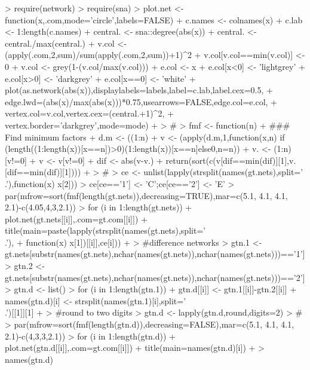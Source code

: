 \documentclass[12pt]{article}
\begin{document}
\begin{Schunk}
\begin{Sinput}
> require(network)
> require(sna)
> plot.net <- function(x,.com,mode='circle',labels=FALSE){
+   c.names <- colnames(x)
+   c.lab <- 1:length(c.names)
+   central. <- sna::degree(abs(x))
+   central. <- central./max(central.)
+   v.col <-(apply(.com,2,sum)/sum(apply(.com,2,sum))+1)^2
+   v.col[v.col==min(v.col)] <- 0
+   v.col <- grey(1-(v.col/max(v.col)))
+   e.col <- x
+   e.col[x<0] <- 'lightgrey'
+   e.col[x>0] <- 'darkgrey'
+   e.col[x==0] <- 'white'
+   plot(as.network(abs(x)),displaylabels=labels,label=c.lab,label.cex=0.5,
+        edge.lwd=(abs(x)/max(abs(x)))*0.75,usearrows=FALSE,edge.col=e.col,
+        vertex.col=v.col,vertex.cex=(central.+1)^2,
+        vertex.border='darkgrey',mode=mode)
+ }
>                                         #
> fmf <- function(n){
+ ### Find minimum factors
+   d.m <- ((1:n)%
+   v <- (apply(d.m,1,function(x,n) if (length((1:length(x))[x==n])>0){(1:length(x))[x==n]}else{0},n=n))
+   v. <- (1:n)[v!=0]
+   v <- v[v!=0]
+   dif <- abs(v-v.)
+   return(sort(c(v[dif==min(dif)][1],v.[dif==min(dif)][1])))
+ }
>                                         #
> ce <- unlist(lapply(strsplit(names(gt.nets),split='\\.'),function(x) x[2]))
> ce[ce=='1'] <- 'C';ce[ce=='2'] <- 'E'
> par(mfrow=sort(fmf(length(gt.nets)),decreasing=TRUE),mar=c(5.1, 4.1, 4.1, 2.1)-c(4.05,4,3,2.1))
> for (i in 1:length(gt.nets)){
+   plot.net(gt.nets[[i]],.com=gt.com[[i]])
+   title(main=paste(lapply(strsplit(names(gt.nets),split='\\.'),
+           function(x) x[1])[[i]],ce[i]))
+ }
>                                         #difference networks
> gtn.1 <- gt.nets[substr(names(gt.nets),nchar(names(gt.nets)),nchar(names(gt.nets)))=='1']
> gtn.2 <- gt.nets[substr(names(gt.nets),nchar(names(gt.nets)),nchar(names(gt.nets)))=='2']
> gtn.d <- list()
> for (i in 1:length(gtn.1)){
+   gtn.d[[i]] <- gtn.1[[i]]-gtn.2[[i]]
+   names(gtn.d)[i] <- strsplit(names(gtn.1)[i],split='\\.')[[1]][1]
+ }
>                                         #round to two digits
> gtn.d <- lapply(gtn.d,round,digits=2)
>                                         #
> par(mfrow=sort(fmf(length(gtn.d)),decreasing=FALSE),mar=c(5.1, 4.1, 4.1, 2.1)-c(4,3,3,2.1))
> for (i in 1:length(gtn.d)){
+   plot.net(gtn.d[[i]],.com=gt.com[[i]])
+   title(main=names(gtn.d)[i])
+ }
> names(gtn.d)
\end{Sinput}
\begin{Soutput}

\end{Soutput}
\end{Schunk}
\end{document}
